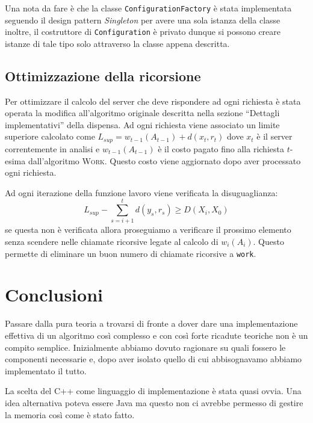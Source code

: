 \documentclass[a4paper, 10pt]{article}
\begin{document}
Una nota da fare è che la classe \texttt{ConfigurationFactory} è stata 
implementata seguendo il design pattern \emph{Singleton} per avere una sola
istanza della classe inoltre, il costruttore di \texttt{Configuration} è 
privato dunque si possono creare istanze di tale tipo solo attraverso la 
classe appena descritta. 

\subsection{Ottimizzazione della ricorsione}
Per ottimizzare il calcolo del server che deve rispondere ad ogni richiesta 
è stata operata la modifica all'algoritmo originale descritta nella sezione
``Dettagli implementativi'' della dispensa. Ad ogni richiesta viene associato
un limite superiore calcolato come $L_{sup} = w_{t - 1}(A_{t - 1}) + d(x_t, r_t)$ 
dove $x_t$ è il server correntemente in analisi e $w_{t - 1}(A_{t - 1})$ è il
costo pagato fino alla richiesta $t$-esima dall'algoritmo \textsc{Work}. Questo
costo viene aggiornato dopo aver processato ogni richiesta. 

Ad ogni iterazione della funzione lavoro viene verificata la disuguaglianza:
\[
  L_{sup} - \sum_{s = i + 1}^{t} d(y_s, r_s) \geq D(X_i, X_0)
\]
se questa non è verificata allora proseguiamo a verificare il prossimo elemento
senza scendere nelle chiamate ricorsive legate al calcolo di $w_i(A_i)$. Questo
permette di eliminare un buon numero di chiamate ricorsive a \texttt{work}. 

\section{Conclusioni}
Passare dalla pura teoria a trovarsi di fronte a dover dare una implementazione 
effettiva di un algoritmo così complesso e con così forte ricadute teoriche 
non è un compito semplice. Inizialmente abbiamo dovuto ragionare su quali 
fossero le componenti necessarie e, dopo aver isolato quello di cui 
abbisognavamo abbiamo implementato il tutto. 

La scelta del C++ come linguaggio di implementazione è stata quasi ovvia. Una 
idea alternativa poteva essere Java ma questo non ci avrebbe permesso di 
gestire la memoria così come è stato fatto.  
\end{document}
